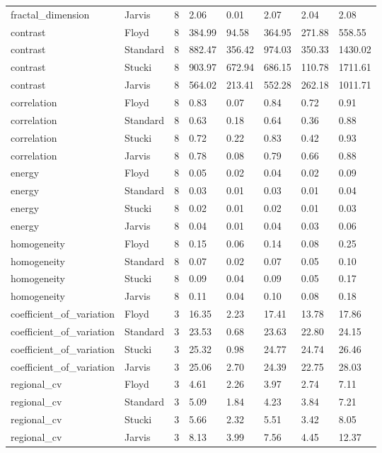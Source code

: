 \begin{tabular}{llrlllll}
fractal_dimension & Jarvis & 8 & 2.06 & 0.01 & 2.07 & 2.04 & 2.08 \\
contrast & Floyd & 8 & 384.99 & 94.58 & 364.95 & 271.88 & 558.55 \\
contrast & Standard & 8 & 882.47 & 356.42 & 974.03 & 350.33 & 1430.02 \\
contrast & Stucki & 8 & 903.97 & 672.94 & 686.15 & 110.78 & 1711.61 \\
contrast & Jarvis & 8 & 564.02 & 213.41 & 552.28 & 262.18 & 1011.71 \\
correlation & Floyd & 8 & 0.83 & 0.07 & 0.84 & 0.72 & 0.91 \\
correlation & Standard & 8 & 0.63 & 0.18 & 0.64 & 0.36 & 0.88 \\
correlation & Stucki & 8 & 0.72 & 0.22 & 0.83 & 0.42 & 0.93 \\
correlation & Jarvis & 8 & 0.78 & 0.08 & 0.79 & 0.66 & 0.88 \\
energy & Floyd & 8 & 0.05 & 0.02 & 0.04 & 0.02 & 0.09 \\
energy & Standard & 8 & 0.03 & 0.01 & 0.03 & 0.01 & 0.04 \\
energy & Stucki & 8 & 0.02 & 0.01 & 0.02 & 0.01 & 0.03 \\
energy & Jarvis & 8 & 0.04 & 0.01 & 0.04 & 0.03 & 0.06 \\
homogeneity & Floyd & 8 & 0.15 & 0.06 & 0.14 & 0.08 & 0.25 \\
homogeneity & Standard & 8 & 0.07 & 0.02 & 0.07 & 0.05 & 0.10 \\
homogeneity & Stucki & 8 & 0.09 & 0.04 & 0.09 & 0.05 & 0.17 \\
homogeneity & Jarvis & 8 & 0.11 & 0.04 & 0.10 & 0.08 & 0.18 \\
coefficient_of_variation & Floyd & 3 & 16.35 & 2.23 & 17.41 & 13.78 & 17.86 \\
coefficient_of_variation & Standard & 3 & 23.53 & 0.68 & 23.63 & 22.80 & 24.15 \\
coefficient_of_variation & Stucki & 3 & 25.32 & 0.98 & 24.77 & 24.74 & 26.46 \\
coefficient_of_variation & Jarvis & 3 & 25.06 & 2.70 & 24.39 & 22.75 & 28.03 \\
regional_cv & Floyd & 3 & 4.61 & 2.26 & 3.97 & 2.74 & 7.11 \\
regional_cv & Standard & 3 & 5.09 & 1.84 & 4.23 & 3.84 & 7.21 \\
regional_cv & Stucki & 3 & 5.66 & 2.32 & 5.51 & 3.42 & 8.05 \\
regional_cv & Jarvis & 3 & 8.13 & 3.99 & 7.56 & 4.45 & 12.37 \\

\end{tabular}
